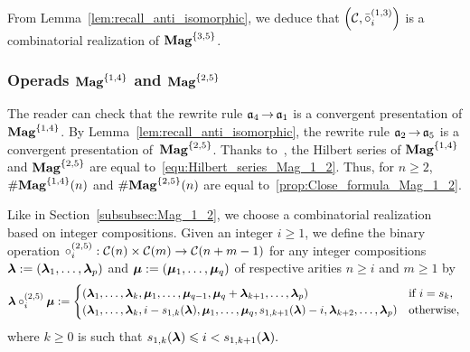 From Lemma~\ref{lem:recall_anti_isomorphic}, we deduce that
$\left(\mathcal{C}, \bar{\circ}_i^{(1,3)}\right)$ is a combinatorial
realization of $\mathbf{Mag}^{\{3, 5\}}$.
\medbreak

\subsubsection{Operads $\mathbf{Mag}^{\{1, 4\}}$ and $\mathbf{Mag}^{\{2, 5\}}$}
The reader can check that the rewrite rule $\mathfrak{a}_4 \operatorname{\to} \mathfrak{a}_1$ is a
convergent presentation of $\mathbf{Mag}^{\{1, 4\}}$. By
Lemma~\ref{lem:recall_anti_isomorphic}, the rewrite rule
$\mathfrak{a}_2 \operatorname{\to} \mathfrak{a}_5$ is a convergent presentation of~$\mathbf{Mag}^{\{2, 5\}}$.
Thanks to~\cite{Gir18}, the Hilbert series of $\mathbf{Mag}^{\{1, 4\}}$ and
$\mathbf{Mag}^{\{2, 5\}}$ are equal to~\eqref{equ:Hilbert_series_Mag_1_2}. Thus,
for $n \geq 2$, $\# \mathbf{Mag}^{\{1, 4\}}(n)$ and $\# \mathbf{Mag}^{\{2, 5\}}(n)$ are
equal to~\eqref{prop:Close_formula_Mag_1_2}.
\medbreak

Like in Section~\ref{subsubsec:Mag_1_2}, we choose a combinatorial
realization based on integer compositions. Given an integer $i \geq 1$,
we define the binary operation
\begin{math}
    \circ_i^{(2,5)} : \mathcal{C}(n) \times \mathcal{C}(m)
    \to\mathcal{C}(n + m - 1)
\end{math}
for any integer compositions
$\bm{\lambda} := \left(\bm{\lambda}_1, \dots, \bm{\lambda}_p\right)$ and
$\bm{\mu} := \left(\bm{\mu}_1, \dots, \bm{\mu}_q\right)$ of respective arities
$n \geq i$ and $m \geq 1$ by
\begin{equation}
    \bm{\lambda} \circ_i^{(2,5)} \bm{\mu} :=
    \begin{cases}
        \left(\bm{\lambda}_1, \dots, \bm{\lambda}_k,
        \bm{\mu}_1, \dots, \bm{\mu}_{q-1}, \bm{\mu}_q+
        \bm{\lambda}_{k + 1}, \dots, \bm{\lambda}_p\right)
            & \mbox{if } i = s_k, \\
        \left(\bm{\lambda}_1, \dots, \bm{\lambda}_k,
        i - s_{1, k}(\bm{\lambda}), \bm{\mu}_1, \dots,
        \bm{\mu}_q, s_{1, k+1}(\bm{\lambda}) - i, \bm{\lambda}_{k + 2}, \dots, 
        \bm{\lambda}_p
        \right)
            & \mbox{otherwise},
    \end{cases}
\end{equation}
where $k \geq 0$ is such that
\begin{math}
    s_{1, k}(\bm{\lambda}) \leqslant i < s_{1, k + 1}(\bm{\lambda}).
\end{math}
\medbreak

